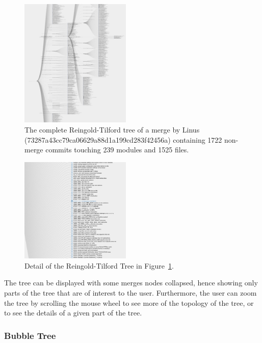 \documentclass[conference, draftclsnofoot, draft]{IEEEtran}
\begin{document}
\begin{figure}
        \centering
        \includegraphics[width=0.47\textwidth]{figures/tree_zoom.png}
        \caption{The complete Reingold-Tilford tree of a merge by Linus
          (73287a43cc79ca06629a88d1a199cd283f42456a) containing 1722 non-merge
          commits touching 239 modules and 1525 files.}
        \label{fig:zoomed_tree}
\end{figure}


\begin{figure}
        \centering
        \includegraphics[width=0.47\textwidth]{figures/tree_view.png}
        \caption{Detail of the Reingold-Tilford Tree in Figure~\ref{fig:zoomed_tree}.}
        \label{fig:tree}
\end{figure}

The tree can be displayed with some merges nodes collapsed, hence
showing only parts of the tree that are of interest to the user. Furthermore, the user can
zoom the tree by scrolling the mouse wheel to see more of the topology of the tree,
or to see the details of a given part of the tree.

\subsubsection{Bubble Tree}
\end{document}

